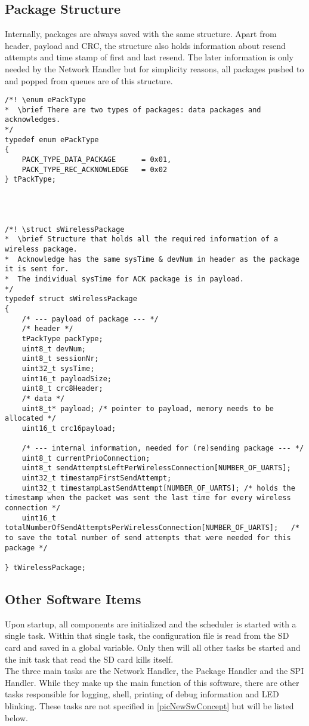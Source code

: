 \subsection{Package Structure} \label{subsec:txtPackageStructure}
Internally, packages are always saved with the same structure. Apart from header, payload and CRC, the structure also holds information about resend attempts and time stamp of first and last resend. The later information is only needed by the Network Handler but for simplicity reasons, all packages pushed to and popped from queues are of this structure.
\begin{lstlisting}
/*! \enum ePackType
*  \brief There are two types of packages: data packages and acknowledges.
*/
typedef enum ePackType
{
    PACK_TYPE_DATA_PACKAGE 		= 0x01,
    PACK_TYPE_REC_ACKNOWLEDGE 	= 0x02
} tPackType;




/*! \struct sWirelessPackage
*  \brief Structure that holds all the required information of a wireless package.
*  Acknowledge has the same sysTime & devNum in header as the package it is sent for.
*  The individual sysTime for ACK package is in payload.
*/
typedef struct sWirelessPackage
{
    /* --- payload of package --- */
    /* header */
    tPackType packType;
    uint8_t devNum;
    uint8_t sessionNr;
    uint32_t sysTime;
    uint16_t payloadSize;
    uint8_t crc8Header;
    /* data */
    uint8_t* payload; /* pointer to payload, memory needs to be allocated */
    uint16_t crc16payload;
    
    /* --- internal information, needed for (re)sending package --- */
    uint8_t currentPrioConnection;
    uint8_t sendAttemptsLeftPerWirelessConnection[NUMBER_OF_UARTS];
    uint32_t timestampFirstSendAttempt;
    uint32_t timestampLastSendAttempt[NUMBER_OF_UARTS];	/* holds the timestamp when the packet was sent the last time for every wireless connection */
    uint16_t totalNumberOfSendAttemptsPerWirelessConnection[NUMBER_OF_UARTS];	/* to save the total number of send attempts that were needed for this package */
    
} tWirelessPackage;
\end{lstlisting}
%
%
%
\subsection{Other Software Items}
Upon startup, all components are initialized and the scheduler is started with a single task. Within that single task, the configuration file is read from the SD card and saved in a global variable. Only then will all other tasks be started and the init task that read the SD card kills itself.\\
The three main tasks are the Network Handler, the Package Handler and the SPI Handler. While they make up the main function of this software, there are other tasks responsible for logging, shell, printing of debug information and LED blinking. These tasks are not specified in \autoref{picNewSwConcept} but will be listed below.\\
%
